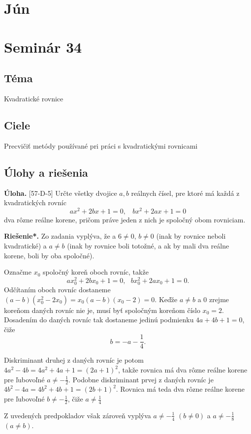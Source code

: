 \documentclass[11pt,a4paper,oneside,final]{book}
\newcommand{\ul}{\textbf{Úloha.} }
\newcommand{\rieh}{\textbf{Riešenie*.} }
\begin{document}
\newpage
\section{Jún}
\section*{Seminár 34}
\subsection*{Téma}
Kvadratické rovnice
\subsection*{Ciele}
Precvičiť metódy používané pri práci s kvadratickými rovnicami

\subsection*{Úlohy a riešenia}
\begin{tcolorbox}[breakable,notitle,boxrule=0pt,colback=light-gray,colframe=light-gray]\ul [57-D-5] Určte všetky dvojice $a, b$ reálnych čísel, pre ktoré má každá z kvadratických rovníc
$$ax^2 + 2bx + 1 = 0, \ \ \ \ bx^2 + 2ax + 1 = 0$$
dva rôzne reálne korene, pričom práve jeden z nich je spoločný obom rovniciam.

\end{tcolorbox}

\rieh Zo zadania vyplýva, že a $6\neq 0$, $b \neq 0$ (inak by rovnice neboli kvadratické)
a $a \neq b$ (inak by rovnice boli totožné, a ak by mali dva reálne korene, boli by oba
spoločné).

Označme $x_0$ spoločný koreň oboch rovníc, takže
$$ax_0^2+ 2bx_0 + 1 = 0,\ \ \ bx_0^2+ 2ax_0 + 1 = 0.$$
Odčítaním oboch rovníc dostaneme $(a - b)(x_0^2- 2x_0 ) = x_0 (a - b)(x_0 - 2) = 0$. Keďže $a \neq b$ a 0 zrejme koreňom daných rovníc nie je, musí byť spoločným koreňom číslo $x_0 = 2$. Dosadením do daných rovníc tak dostaneme jedinú podmienku $4a + 4b + 1 = 0$, čiže
$$b = -a -\frac{1}{4}.$$


Diskriminant druhej z daných rovníc je potom $4a^2 - 4b = 4a^2 + 4a + 1 = (2a + 1)^2$, takže rovnica má dva rôzne reálne korene pre ľubovoľné $a \neq -\frac{1}{2}$. Podobne diskriminant prvej z daných rovníc je $4b^2- 4a = 4b^2 + 4b +1 = (2b +1)^2$. Rovnica má teda dva rôzne reálne korene pre ľubovoľné $b \neq -\frac{1}{2}$, čiže $a\neq  \frac{1}{4}$

Z uvedených predpokladov však zároveň vyplýva $a \neq -\frac{1}{4}$ $(b \neq 0)$ a $a \neq - \frac{1}{8}$ $(a \neq b)$.
\end{document}
